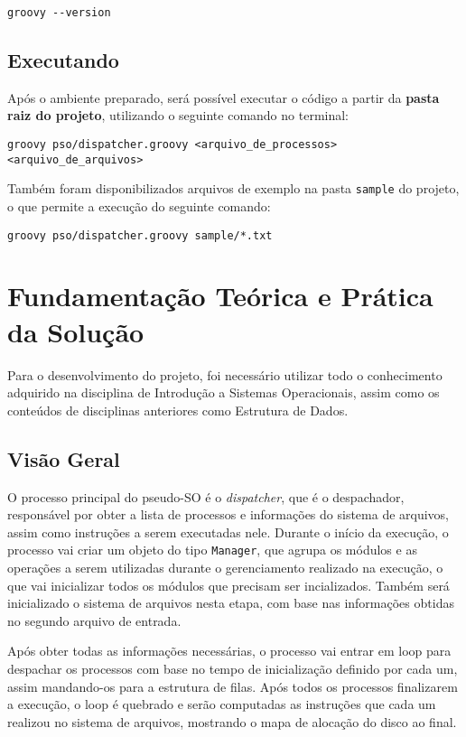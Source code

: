 \documentclass[12pt]{article}
\begin{document}
\begin{verbatim}
groovy --version
\end{verbatim}

\subsection{Executando}
Após o ambiente preparado, será possível executar o código a partir da \textbf{pasta raiz do projeto}, utilizando o seguinte comando no terminal:

\begin{verbatim}
groovy pso/dispatcher.groovy <arquivo_de_processos> <arquivo_de_arquivos>
\end{verbatim}

Também foram disponibilizados arquivos de exemplo na pasta \texttt{sample} do projeto, o que permite a execução do seguinte comando:

\begin{verbatim}
groovy pso/dispatcher.groovy sample/*.txt
\end{verbatim}

\section{Fundamentação Teórica e Prática da Solução}
Para o desenvolvimento do projeto, foi necessário utilizar todo o conhecimento adquirido na disciplina de Introdução a Sistemas Operacionais, assim como os conteúdos de disciplinas anteriores como Estrutura de Dados.

\subsection{Visão Geral}
O processo principal do pseudo-SO é o \textit{dispatcher}, que é o despachador, responsável por obter a lista de processos e informações do sistema de arquivos, assim como instruções a serem executadas nele. Durante o início da execução, o processo vai criar um objeto do tipo \texttt{Manager}, que agrupa os módulos e as operações a serem utilizadas durante o gerenciamento realizado na execução, o que vai inicializar todos os módulos que precisam ser incializados. Também será inicializado o sistema de arquivos nesta etapa, com base nas informações obtidas no segundo arquivo de entrada.

Após obter todas as informações necessárias, o processo vai entrar em loop para despachar os processos com base no tempo de inicialização definido por cada um, assim mandando-os para a estrutura de filas. Após todos os processos finalizarem a execução, o loop é quebrado e serão computadas as instruções que cada um realizou no sistema de arquivos, mostrando o mapa de alocação do disco ao final.
\end{document}

